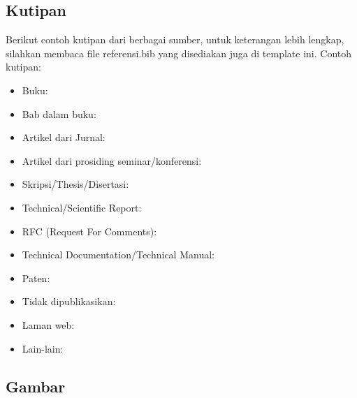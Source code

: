  
\subsection{Kutipan}
\label{subs:kutipan} 
Berikut contoh kutipan dari berbagai sumber, untuk keterangan lebih lengkap, silahkan membaca file referensi.bib yang disediakan juga di template ini.
Contoh kutipan:
\begin{itemize}
	\item Buku:~\cite{berg:08:compgeom} 
	\item Bab dalam buku:~\cite{kreveld:04:GIS}
	\item Artikel dari Jurnal:~\cite{buchin:13:median}
	\item Artikel dari prosiding seminar/konferensi:~\cite{kreveld:11:median}
	\item Skripsi/Thesis/Disertasi:~\cite{lionov:02:animasi}~\cite{wiratma:10:following}~\cite{wiratma:22:later}
	\item Technical/Scientific Report:~\cite{kreveld:07:watertight}
	\item RFC (Request For Comments):~\cite{RFC1654}
	\item Technical Documentation/Technical Manual:~\cite{Z.500}~\cite{unicode:16:stdv9}~\cite{google:16:and7}
	\item Paten:~\cite{webb:12:comm}
	\item Tidak dipublikasikan:~\cite{wiratma:09:median}~\cite{lionov:11:cpoly}
	\item Laman web:~\cite{erickson:03:cgmodel}  
	\item Lain-lain:~\cite{agung:12:tango}
\end{itemize}    
  
\subsection{Gambar}


